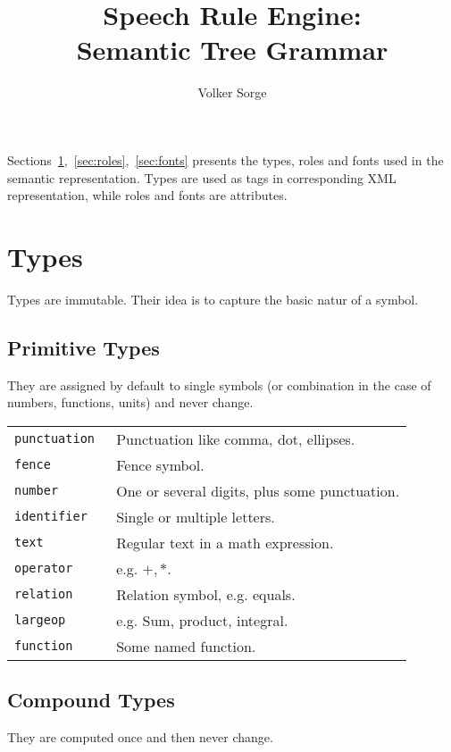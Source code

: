 \documentclass{article}
\title{Speech Rule Engine:\\ Semantic Tree Grammar}
\author{Volker Sorge}
\begin{document}
\maketitle

Sections~\ref{sec:types},~\ref{sec:roles},~\ref{sec:fonts} presents the types,
roles and fonts used in the semantic representation. Types are used as tags in
corresponding XML representation, while roles and fonts are attributes.

\section{Types}
\label{sec:types}

Types are immutable. Their idea is to capture the basic natur of a symbol.

\subsection{Primitive Types}
\label{sec:primitive types}

They are assigned by default to single symbols (or combination in the case of
numbers, functions, units) and never change.

\begin{tabular}{>{\tt}ll}
  punctuation & Punctuation like comma, dot, ellipses.\\
  fence & Fence symbol.\\
  number & One or several digits, plus some punctuation.\\
  identifier & Single or multiple letters.\\
  text & Regular text in a math expression.\\
  operator & e.g. $+, *$.\\
  relation & Relation symbol, e.g. equals.\\
  largeop & e.g. Sum, product, integral.\\
  function & Some named function.\\
\end{tabular}

\subsection{Compound Types}
\label{sec:compound types}

They are computed once and then never change.
\end{document}
